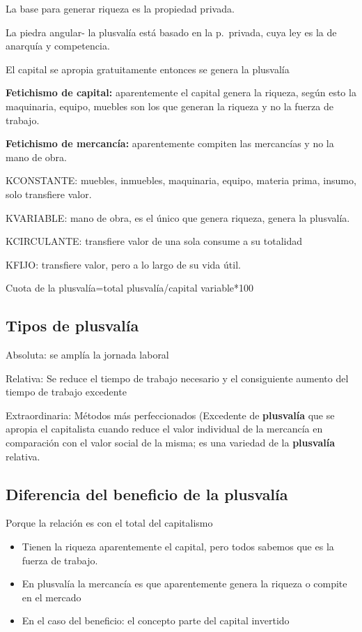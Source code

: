 \documentclass[
  a4paper,
]{article}
\begin{document}
La base para generar riqueza es la propiedad privada.

La piedra angular- la plusvalía está basado en la p.~privada, cuya ley
es la de anarquía y competencia.

El capital se apropia gratuitamente entonces se genera la plusvalía

\textbf{Fetichismo de capital:} aparentemente el capital genera la
riqueza, según esto la maquinaria, equipo, muebles son los que generan
la riqueza y no la fuerza de trabajo.

\textbf{Fetichismo de mercancía:} aparentemente compiten las mercancías
y no la mano de obra.

KCONSTANTE: muebles, inmuebles, maquinaria, equipo, materia prima,
insumo, solo transfiere valor.

KVARIABLE: mano de obra, es el único que genera riqueza, genera la
plusvalía.

KCIRCULANTE: transfiere valor de una sola consume a su totalidad

KFIJO: transfiere valor, pero a lo largo de su vida útil.

Cuota de la plusvalía=total plusvalía/capital variable*100

\hypertarget{tipos-de-plusvaluxeda-1}{%
\subsection{Tipos de plusvalía}\label{tipos-de-plusvaluxeda-1}}

Absoluta: se amplía la jornada laboral

Relativa: Se reduce el tiempo de trabajo necesario y el consiguiente
aumento del tiempo de trabajo excedente

Extraordinaria: Métodos más perfeccionados (Excedente de
\textbf{plusvalía} que se apropia el capitalista cuando reduce el valor
individual de la mercancía en comparación con el valor social de la
misma; es una variedad de la \textbf{plusvalía} relativa.

\hypertarget{diferencia-del-beneficio-de-la-plusvaluxeda}{%
\subsection{Diferencia del beneficio de la
plusvalía}\label{diferencia-del-beneficio-de-la-plusvaluxeda}}

Porque la relación es con el total del capitalismo

\begin{itemize}
\item
  Tienen la riqueza aparentemente el capital, pero todos sabemos que es
  la fuerza de trabajo.
\item
  En plusvalía la mercancía es que aparentemente genera la riqueza o
  compite en el mercado
\item
  En el caso del beneficio: el concepto parte del capital invertido
\end{itemize}
\end{document}
